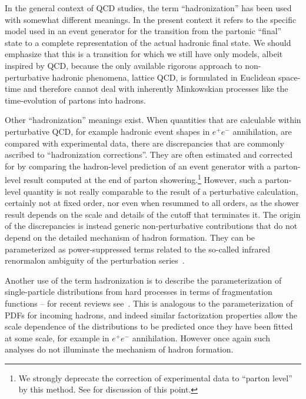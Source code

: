 
In the general context of QCD studies, the term ``hadronization'' has
been used with somewhat different meanings. 
In the present context it refers to the specific
model used in an event generator for the transition from the partonic
``final'' state to a complete representation of the actual hadronic
final state.  We should emphasize that this is a transition for which we
still have only models, albeit inspired by QCD, because the only
available rigorous approach to non-perturbative hadronic phenomena, lattice
QCD, is formulated in Euclidean space-time and therefore cannot deal
with inherently Minkowskian processes like the time-evolution of
partons into hadrons.

Other ``hadronization'' meanings exist. When quantities that
are calculable within perturbative QCD, for example hadronic event
shapes in $e^+e^-$ annihilation, are compared with experimental data,
there are discrepancies that are commonly ascribed to ``hadronization
corrections''.  They are often estimated and corrected for by comparing
the hadron-level prediction of an event generator with a parton-level
result computed at the end of parton showering.\footnote{We strongly
  deprecate the correction of experimental data to ``parton level''
  by this method. See  for discussion of
  this point.}  However, such a
parton-level quantity is not really comparable to the result of a
perturbative calculation, certainly not at fixed order, nor even when
resummed to all orders, as the shower result depends on the scale and
details of the cutoff that terminates it.  The origin of the
discrepancies is instead generic non-perturbative contributions
that do not depend on the detailed mechanism of hadron
formation.  They can be parameterized as power-suppressed terms
related to the so-called infrared renormalon ambiguity of the perturbation
series~\cite{Webber:1994cp,Korchemsky:1994is,Dokshitzer:1995zt,Dokshitzer:1995qm}.

Another use of the term hadronization is to describe the
parameterization of single-particle distributions from hard processes
in terms of fragmentation functions -- for recent reviews
see~\cite{Amsler:2008zzb,Albino:2008gy}.
This is analogous to the parameterization of PDFs for incoming hadrons,
and indeed similar factorization properties allow the scale dependence
of the distributions to be predicted once they have been fitted at
some scale, for example in $e^+e^-$ annihilation.  However once again
such analyses do not illuminate the mechanism of hadron formation.

